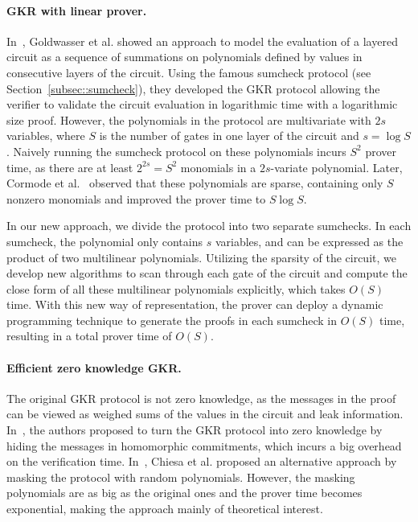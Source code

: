 \paragraph{GKR with linear prover.} In~\cite{GKR}, Goldwasser et al. showed an approach to model the evaluation of a layered circuit as a sequence of summations on polynomials defined by values in consecutive layers of the circuit. Using the famous sumcheck protocol (see Section~\ref{subsec::sumcheck}), they developed the GKR protocol allowing the verifier to validate the circuit evaluation in logarithmic time with a logarithmic size proof. However, the polynomials in the protocol are multivariate with $2s$ variables, where $S$ is the number of gates in one layer of the circuit and $s = \log S$. Naively running the sumcheck protocol on these polynomials incurs $S^2$ prover time, as there are at least $2^{2s}=S^2$ monomials in a $2s$-variate polynomial. Later, Cormode et al.~\cite{CMT} observed that these polynomials are sparse, containing only $S$ nonzero monomials and improved the prover time to $S\log S$.

In our new approach, we divide the protocol into two separate sumchecks. In each sumcheck, the polynomial only contains $s$ variables, and can be expressed as the product of two multilinear polynomials. Utilizing the sparsity of the circuit, we develop new algorithms to scan through each gate of the circuit and compute the close form of all these multilinear polynomials explicitly, which takes $O(S)$ time. With this new way of representation, the prover can deploy a dynamic programming technique to generate the proofs in each sumcheck in $O(S)$ time, resulting in a total prover time of $O(S)$. 

\paragraph{Efficient zero knowledge GKR.} The original GKR protocol is not zero knowledge, as the messages in the proof can be viewed as weighed sums of the values in the circuit and leak information. In~\cite{zkvpd,hyrax}, the authors proposed to turn the GKR protocol into zero knowledge by hiding the messages in homomorphic commitments, which incurs a big overhead on the verification time. In~\cite{zksumcheck}, Chiesa et al. proposed an alternative approach by masking the protocol with random polynomials. However, the masking polynomials are as big as the original ones and the prover time becomes exponential, making the approach mainly of theoretical interest. 

